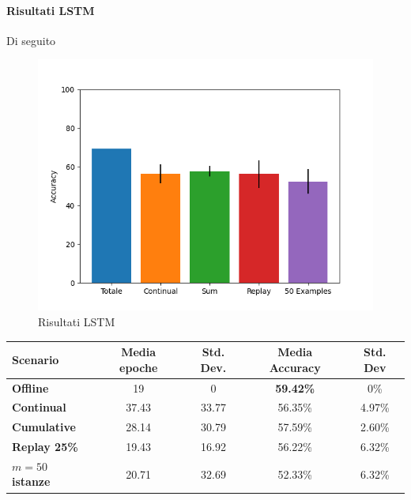 \documentclass[11pt, a4paper, twoside, openright]{book}
\begin{document}
\paragraph{Risultati LSTM} Di seguito\\
\begin{figure}[h]
    \centering
    \includegraphics[scale=0.75]{img/autotest_LSTM.png}
    \caption{Risultati LSTM}
    \label{fig:autotest_LSTM}
\end{figure}
\begin{tabular}{l|c|c|c|c}
    \textbf{Scenario} & \textbf{Media epoche} & \textbf{Std. Dev.} & \textbf{Media Accuracy} & \textbf{Std. Dev} \\
    \hline 
    \textbf{Offline} & 19 & 0 &\textbf{ 59.42\%} & 0\% \\
    \textbf{Continual} & 37.43 & 33.77 & 56.35\% & 4.97\%\\
    \textbf{Cumulative} & 28.14 & 30.79 & 57.59\% & 2.60\%\\
    \textbf{Replay 25\%} & 19.43 & 16.92 & 56.22\% & 6.32\%\\
    \textbf{$m = 50$ istanze} & 20.71 & 32.69 & 52.33\% & 6.32\%\\
\end{tabular}
\end{document}
